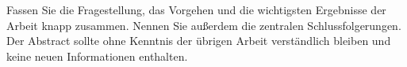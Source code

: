 

Fassen Sie die Fragestellung, das Vorgehen und die wichtigsten Ergebnisse der
Arbeit knapp zusammen. Nennen Sie außerdem die zentralen Schlussfolgerungen. Der
Abstract sollte ohne Kenntnis der übrigen Arbeit verständlich bleiben und keine
neuen Informationen enthalten.
